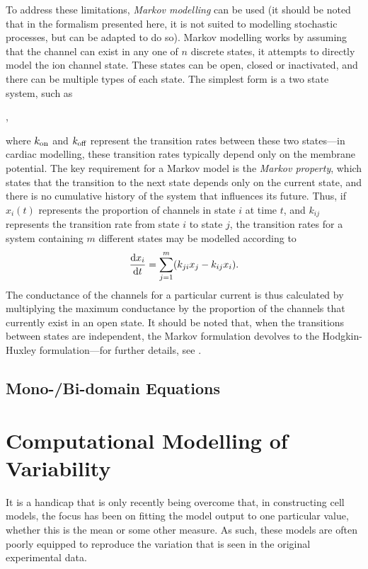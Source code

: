\documentclass[../thesis-main.tex]{subfiles}
\begin{document}
To address these limitations, \emph{Markov modelling} can be used (it should be noted that in the formalism presented here, it is not suited to modelling stochastic processes, but can be adapted to do so). Markov modelling works by assuming that the channel can exist in any one of $n$ discrete states, \idest{} it attempts to directly model the ion channel state. These states can be open, closed or inactivated, and there can be multiple types of each state. The simplest form is a two state system, such as
\begin{center}
 ,
\end{center}
where $k_\textnormal{on}$ and $k_\textnormal{off}$ represent the transition rates between these two states---in cardiac modelling, these transition rates typically depend only on the membrane potential. The key requirement for a Markov model is the \emph{Markov property}, which states that the transition to the next state depends only on the current state, and there is no cumulative history of the system that influences its future. Thus, if $x_i(t)$ represents the proportion of channels in state $i$ at time $t$, and $k_{ij}$ represents the transition rate from state $i$ to state $j$, the transition rates for a system containing $m$ different states may be modelled according to
\begin{equation}
 \frac{\textnormal{d}x_i}{\textnormal{d}t} = \sum_{j=1}^m (k_{ji}x_j - k_{ij}x_i).
\end{equation}
The conductance of the channels for a particular current is thus calculated by multiplying the maximum conductance by the proportion of the channels that currently exist in an open state. It should be noted that, when the transitions between states are independent, the Markov formulation devolves to the Hodgkin-Huxley formulation---for further details, see \citet{Rudy2006}.

\subsection{Mono-/Bi-domain Equations}
\label{subsec:monodomain-bidomain}

\section{Computational Modelling of Variability}
\label{sec:comp-var}
It is a handicap that is only recently being overcome that, in constructing cell models, the focus has been on fitting the model output to one particular value, whether this is the mean or some other measure. As such, these models are often poorly equipped to reproduce the variation that is seen in the original experimental data.
\end{document}
